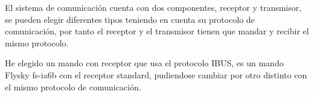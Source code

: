 
	El sistema de comunicación cuenta con dos componentes, receptor y transmisor, se pueden elegir diferentes tipos teniendo en cuenta su protocolo de comunicación, por tanto el receptor y el transmisor tienen que mandar y recibir el mismo protocolo.
	
		
	
	He elegido un mando con receptor que usa el protocolo IBUS, es un mando Flysky fs-ia6b con el receptor standard, pudiendose cambiar por otro distinto con el mismo protocolo de comunicación.